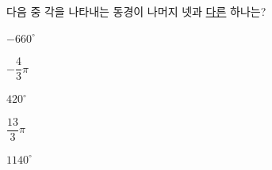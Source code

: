 다음 중 각을 나타내는 동경이 나머지 넷과 \underline{다른} 하나는?
\begin{choices32}{\rule[-3ex]{0pt}{8ex}$-660^\circ$}{\rule[-3ex]{0pt}{8ex}$-\dfrac{4}{3}\pi$}{\rule[-3ex]{0pt}{8ex}$420^\circ$}{\rule[-3ex]{0pt}{8ex}$\dfrac{13}{3}\pi$}{\rule[-3ex]{0pt}{8ex}$1140^\circ$}\end{choices32}
